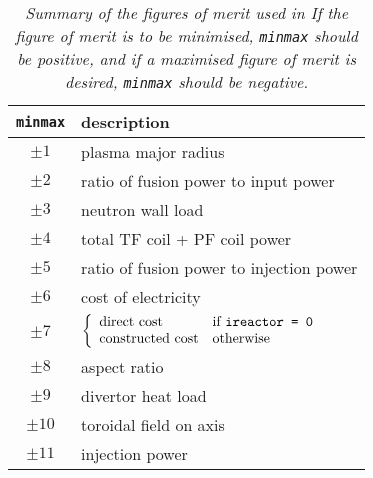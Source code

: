 
\begin{table}[tbph]
\begin{center}

\begin{tabular}{||c|l||} \hline
{\tt minmax} & description                            \\ \hline
$\pm 1 $     & plasma major radius \\
$\pm 2 $     & ratio of fusion power to input power \\
$\pm 3 $     & neutron wall load \\
$\pm 4 $     & total TF coil + PF coil power \\
$\pm 5 $     & ratio of fusion power to injection power \\
$\pm 6 $     & cost of electricity \\
$\pm 7 $     & 
$ \left\{ \begin{array}{ll}
 \mbox{direct cost} & \mbox{if {\tt ireactor = 0}} \\
 \mbox{constructed cost} & \mbox{otherwise}
\end{array} \right.
$ \\
$\pm 8 $     & aspect ratio \\
$\pm 9 $     & divertor heat load \\
$\pm 10$     & toroidal field on axis \\
$\pm 11$     & injection power \\ \hline
\end{tabular}
\end{center}
\caption[TABLE_FOMS]{{\it
Summary of the figures of merit used in \PSD If the figure of merit is
to be minimised, {\tt minmax} should be positive, and if a maximised
figure of merit is desired, {\tt minmax} should be negative.
}}
\label{tab:foms}
\end{table}
